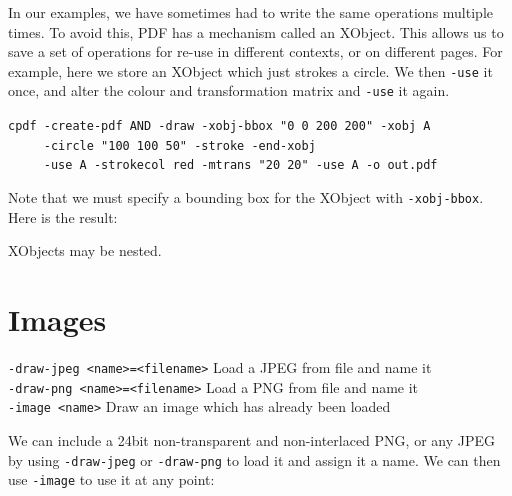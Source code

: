 \documentclass{book}
\begin{document}
In our examples, we have sometimes had to write the same operations multiple times. To avoid this, PDF has a mechanism called an XObject. This allows us to save a set of operations for re-use in different contexts, or on different pages. For example, here we store an XObject which just strokes a circle. We then \texttt{-use} it once, and alter the colour and transformation matrix and \texttt{-use} it again.

\begin{framed}
 \noindent\small\verb?cpdf -create-pdf AND -draw -xobj-bbox "0 0 200 200" -xobj A?\\
 \noindent\small\verb?     -circle "100 100 50" -stroke -end-xobj?\\
 \noindent\small\verb?     -use A -strokecol red -mtrans "20 20" -use A -o out.pdf?
\end{framed}

\noindent Note that we must specify a bounding box for the XObject with \texttt{-xobj-bbox}. Here is the result:

\bigskip
{}
\bigskip

\noindent XObjects may be nested.

\section{Images}
  {\small\begin{framed}
   \noindent\verb!-draw-jpeg <name>=<filename>! Load a JPEG from file and name it\\
   \noindent\verb!-draw-png <name>=<filename>! Load a PNG from file and name it\\
   \noindent\verb!-image <name>! Draw an image which has already been loaded
  \end{framed}}

We can include a 24bit non-transparent and non-interlaced PNG, or any JPEG by using \texttt{-draw-jpeg} or \texttt{-draw-png} to load it and assign it a name. We can then use \texttt{-image} to use it at any point:
\end{document}
